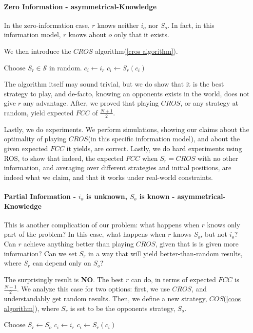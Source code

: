 \documentclass[a4paper,english,10pt]{article}
\newcommand\rob{\ensuremath{r}\xspace}
\newcommand\opp{\ensuremath{o}\xspace}
\newcommand{\fcc}{\ensuremath{FCC}\xspace}
\newcommand{\cros}{\ensuremath{CROS}\xspace}
\newcommand{\coos}{\ensuremath{COS}\xspace}
\begin{document}
\paragraph{Zero Information - asymmetrical-Knowledge}
In the zero-information case, \rob knows neither $i_\opp$ nor $S_\opp$. In fact, in this information model, \rob knows about \opp only that it exists.

We then introduce the \cros algorithm(\ref{cros algorithm}). 
\begin{algorithm}
\begin{algorithmic}
	\STATE Choose $S_\rob \in \mathcal{S}$ in random.
    \STATE $c_i \leftarrow i_\rob$
    \LOOP
    	\STATE $c_i \leftarrow S_\rob(c_i)$
    \ENDLOOP
  
\end{algorithmic}
\caption{\cros\label{cros algorithm}}
\end{algorithm}

The algorithm itself may sound trivial, but we do show that it is the best strategy to play, and de-facto, knowing an opponents exists in the world, does not give \rob any advantage. After, we proved that playing \cros, or any strategy at random, yield expected \fcc of $\frac{N+1}{2}$.

Lastly, we do experiments. We perform simulations, showing our claims about the optimality of playing \cros (in this specific information model), and about the given expected \fcc it yields, are correct. 
Lastly, we do hard experiments using ROS, to show that indeed, the expected \fcc when $S_\rob=\cros$ with no other information, and averaging over different strategies and initial positions, are indeed what we claim, and that it works under real-world constraints.

\paragraph{Partial Information - $i_\opp$ is unknown, $S_\opp$ is known - asymmetrical-Knowledge} 
This is another complication of our problem: what happens when \rob knows only part of the problem? In this case, what happens when \rob knows $S_\opp$, but not $i_\opp$? Can \rob achieve anything better than playing \cros, given that is is given more information? Can we set $S_\rob$ in a way that will yield better-than-random results, where $S_\rob$ can depend only on $S_\opp$?

The surprisingly result is \textbf{NO}. The best \rob can do, in terms of expected \fcc is $\frac{N+1}{2}$. 
We analyze this case for two options: first, we use \cros, and understandably get random results.
Then, we define a new strategy, \coos(\ref{coos algorithm}), where $S_\rob$ is set to be the opponents strategy, $S_\opp$. 
\begin{algorithm}
\begin{algorithmic}
	\STATE Choose $S_\rob \leftarrow S_\opp$
    \STATE $c_i \leftarrow i_\rob$
    \LOOP
    	\STATE $c_i \leftarrow S_\rob(c_i)$
    \ENDLOOP
  
\end{algorithmic}
\caption{\coos\label{coos algorithm}}
\end{algorithm}
\end{document}
